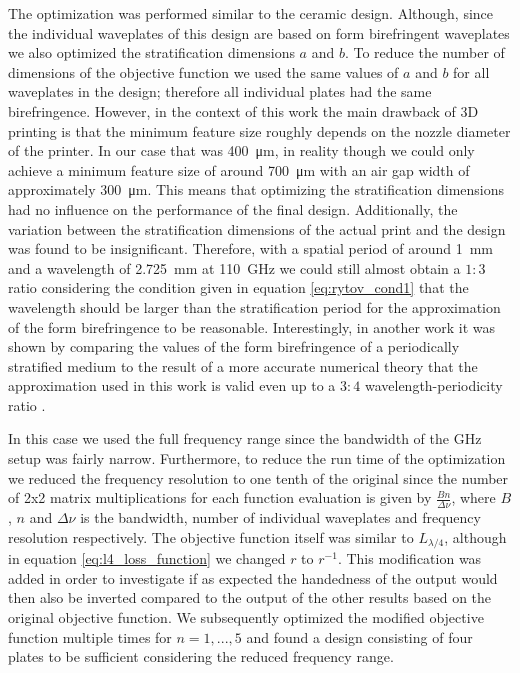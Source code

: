 The optimization was performed similar to the ceramic design. Although, since the individual waveplates of this design are based on form birefringent waveplates we also optimized the stratification dimensions $a$ and $b$. To reduce the number of dimensions of the objective function we used the same values of $a$ and $b$ for all waveplates in the design; therefore all individual plates had the same birefringence. However, in the context of this work the main drawback of 3D printing is that the minimum feature size roughly depends on the nozzle diameter of the printer. In our case that was \SI{400}{\micro \meter}, in reality though we could only achieve a minimum feature size of around \SI{700}{\micro \meter} with an air gap width of approximately \SI{300}{\micro \meter}. This means that optimizing the stratification dimensions had no influence on the performance of the final design. Additionally, the variation between the stratification dimensions of the actual print and the design was found to be insignificant. 
Therefore, with a spatial period of around \SI{1}{\milli \meter} and a wavelength of \SI{2.725}{\milli \meter} at \SI{110}{\giga \hertz} we could still almost obtain a $1:3$ ratio considering the condition given in equation \ref{eq:rytov_cond1} that the wavelength should be larger than the stratification period for the approximation of the form birefringence to be reasonable. Interestingly, in another work it was shown by comparing the values of the form birefringence of a periodically stratified medium to the result of a more accurate numerical theory that the approximation used in this work is valid even up to a $3:4$ wavelength-periodicity ratio \cite{Busch2016}.

In this case we used the full frequency range since the bandwidth of the GHz setup was fairly narrow. Furthermore, to reduce the run time of the optimization we reduced the frequency resolution to one tenth of the original since the number of 2x2 matrix multiplications for each function evaluation is given by $\frac{Bn}{\Delta \nu}$, where $B$, $n$ and $\Delta \nu$ is the bandwidth, number of individual waveplates and frequency resolution respectively. The objective function itself was similar to $L_{\lambda/4}$, although in equation \ref{eq:l4_loss_function} we changed $r$ to $r^{-1}$. This modification was added in order to investigate if as expected the handedness of the output would then also be inverted compared to the output of the other results based on the original objective function. We subsequently optimized the modified objective function multiple times for $n=1, ..., 5$ and found a design consisting of four plates to be sufficient considering the reduced frequency range. 

